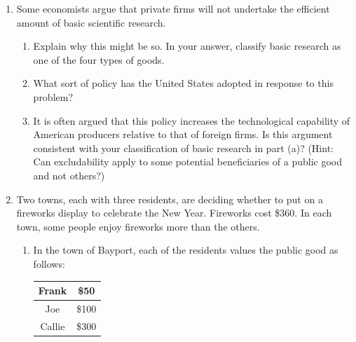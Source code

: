 \documentclass{article}
\begin{document}
\begin{enumerate}
\begin{enumerate}
	\item Is there any way to split the cost to ensure that everyone benefits? What practical problems does this solution raise?
	
	\item Suppose they agree in advance to choose the efficient number and to split the cost of the movies equally. When Dwayne is asked his willingness to pay, will he have an incentive to tell the truth? If so, why? If not, what will he be tempted to say?
	
	\item What does this example teach you about the optimal provision of public goods?
	
	\end{enumerate}
	
\item Some economists argue that private firms will not undertake the efficient amount of basic scientific research.

	\begin{enumerate}

	\item Explain why this might be so. In your answer, classify basic research as one of the four types of goods.
	
	\item What sort of policy has the United States adopted in response to this problem?
	
	\item It is often argued that this policy increases the technological capability of American producers relative to that of foreign firms. Is this argument consistent with your classification of basic research in part (a)? (Hint: Can excludability apply to some potential beneficiaries of a public good and not others?)
	
	\end{enumerate}
	
\item Two towns, each with three residents, are deciding whether to put on a fireworks display to celebrate the New Year. Fireworks cost \$360. In each town, some people enjoy fireworks more than the others.

	\begin{enumerate}
	
	\item In the town of Bayport, each of the residents values the public good as follows:
	
	\begin{center}
	\begin{tabular}{| c | c |}
	\hline
	Frank & \$50 \\
	\hline
	Joe & \$100 \\
	\hline
	Callie & \$300 \\
	\hline
	\end{tabular}
	\end{center}
	

\end{enumerate}
\end{enumerate}
\end{document}

